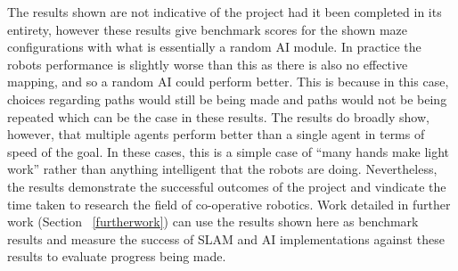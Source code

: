 The results shown are not indicative of the project had it been completed in its 
entirety, however these results give benchmark scores for the shown maze 
configurations with what is essentially a random AI module. In practice 
the robots performance is slightly worse than this as there is also no 
effective mapping, 
and so a random AI could perform better. This is because in this case, choices 
regarding paths would still be being made and paths would not be being repeated 
which can be the case in these results. The results do broadly show, however, 
that multiple agents perform better than a single agent in terms of speed of 
the goal. In these cases, this is a simple case of ``many hands make light 
work'' rather than anything intelligent that the robots are doing. 
Nevertheless, the results demonstrate the successful outcomes of the project 
and vindicate the time taken to research the field of co-operative robotics. 
Work detailed in further work (Section~
\ref{furtherwork}) can use the results shown here as benchmark results and 
measure the success of SLAM and AI implementations against these results to 
evaluate progress being made. 
